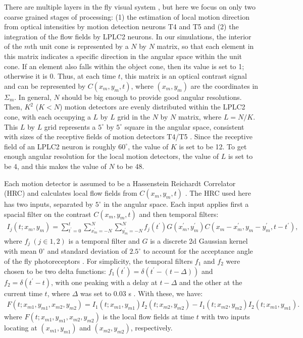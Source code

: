 \documentclass[pdftex,9pt,lineno]{elife}
\begin{document}
There are multiple layers in the fly visual system \citep{takemura2017comprehensive}, but here we focus on only two coarse grained stages of processing: (1) the estimation of local motion direction from optical intensities by motion detection neurons T4 and T5 and (2) the integration of the flow fields by LPLC2 neurons. In our simulations, the interior of the $m$th unit cone is represented by a $N$ by $N$ matrix, so that each element in this matrix indicates a specific direction in the angular space within the unit cone. If an element also falls within the object cone, then its value is set to 1; otherwise it is 0. Thus, at each time $t$, this matrix is an optical contrast signal and can be represented by $C(x_{m},y_{m},t)$, where $(x_{m},y_{m})$ are the coordinates in $\Sigma_{m}$. In general, $N$ should be big enough to provide good angular resolutions. Then, $K^{2}$ ($K<N$) motion detectors are evenly distributed within the LPLC2 cone, with each occupying a $L$ by $L$ grid in the $N$ by $N$ matrix, where $L=N/K$. This $L$ by $L$ grid represents a $5^{\circ}$ by $5^{\circ}$ square in the angular space, consistent with sizes of the receptive fields of motion detectors T4/T5 \citep{zavatone2020minimal}. Since the receptive field of an LPLC2 neuron is roughly $60^{\circ}$, the value of $K$ is set to be 12. To get enough angular resolution for the local motion detectors, the value of $L$ is set to be 4, and this makes the value of $N$ to be 48.

Each motion detector is assumed to be a Hassenstein Reichardt Correlator (HRC) and calculates local flow fields from $C(x_{m},y_{m},t)$ \citep{hassenstein1956systemtheoretische}. The HRC used here has two inputs, separated by $5^{\circ}$ in the angular space. Each input applies first a spacial filter on the contrast $C(x_{m},y_{m},t)$ and then temporal filters:
\begin{align}
I_{j}(t;x_{m},y_{m}) = \sum_{t^{'}=0}^{t}\sum_{x^{'}_{m}=-N}^{N}\sum_{y^{'}_{m}=-N}^{N}f_{j}(t^{'})G(x^{'}_{m},y^{'}_{m})C(x_{m}-x^{'}_{m},y_{m}-y^{'}_{m},t-t^{'}),
\end{align}
where $f_{j}\ (j \in {1,2})$ is a temporal filter and $G$ is a discrete 2d Gaussian kernel with mean $0^{\circ}$ and standard deviation of $2.5^{\circ}$ to account for the acceptance angle of the fly photoreceptors \citep{stavenga2003angular}. For simplicity, the temporal filters $f_{1}$ and $f_{2}$ were chosen to be two delta functions: $f_{1}(t^{'})=\delta (t^{'}-(t-\Delta))$ and $f_{2}=\delta (t^{'}-t)$, with one peaking with a delay at $t-\Delta$ and the other at the current time $t$, where $\Delta$ was set to 0.03 s \citep{salazar2016direct}. With these, we have:
\begin{align}\label{eq:HRC}
F(t;x_{m1},y_{m1},x_{m2},y_{m2}) = I_{1}(t;x_{m1},y_{m1})I_{2}(t;x_{m2},y_{m2})-I_{1}(t;x_{m2},y_{m2})I_{2}(t;x_{m1},y_{m1}).
\end{align}
where $F(t;x_{m1},y_{m1},x_{m2},y_{m2})$ is the local flow fields at time $t$ with two inputs locating at $(x_{m1},y_{m1})$ and $(x_{m2},y_{m2})$, respectively.
\end{document}

